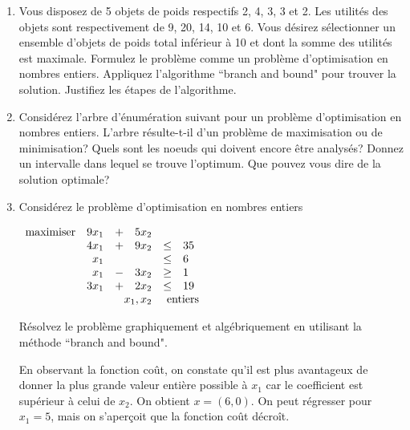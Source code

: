 \begin{enumerate}
  \item Vous disposez de 5 objets de poids respectifs 2, 4, 3, 3 et 2. Les
    utilités des objets sont respectivement de 9, 20, 14, 10 et 6. Vous désirez
    sélectionner un ensemble d'objets de poids total inférieur  à 10
    et dont la somme des utilités est maximale.  Formulez le problème
    comme un problème d'optimisation en nombres entiers. Appliquez l'algorithme ``branch and bound" pour trouver la
    solution. Justifiez les étapes de l'algorithme.


    \begin{solution}
      \nosolution
    \end{solution}

  \item  Considérez l'arbre d'énumération suivant pour un problème d'optimisation en nombres entiers. L'arbre
    résulte-t-il d'un problème de maximisation ou de minimisation?  Quels sont les noeuds qui doivent encore être analysés? Donnez
    un intervalle dans lequel se trouve l'optimum. Que pouvez vous dire de la solution optimale?








    \begin{solution}
      \nosolution
    \end{solution}

  \item Considérez le problème d'optimisation en nombres entiers

    $
    \begin{array}{lrcrcl}
      \maxi & 9x_1 & +&  5 x_2\\
      & 4 x_1 &+& 9 x_2  & \leq & 35 \\
      & x_1    &  &       &  \leq & 6\\
      &   x_1& -&  3x_2  & \geq & 1 \\
      & 3 x_1    & + & 2x_2   &  \leq & 19\\
      &   \multicolumn{3}{r}{x_1, x_2}  & \multicolumn{2}{l}{\mbox{ entiers}}
    \end{array}
    $


    Résolvez le problème graphiquement et algébriquement en utilisant la méthode ``branch and bound".



    \begin{solution}
      En observant la fonction coût, on constate qu'il est plus avantageux de donner la plus grande valeur entière possible à $x_{1}$ car le coefficient est supérieur à celui de $x_{2}$. On obtient $x = (6,0)$. On peut régresser pour $x_{1} = 5$, mais on s'aperçoit que la fonction coût décroît.
    \end{solution}


\end{enumerate}
